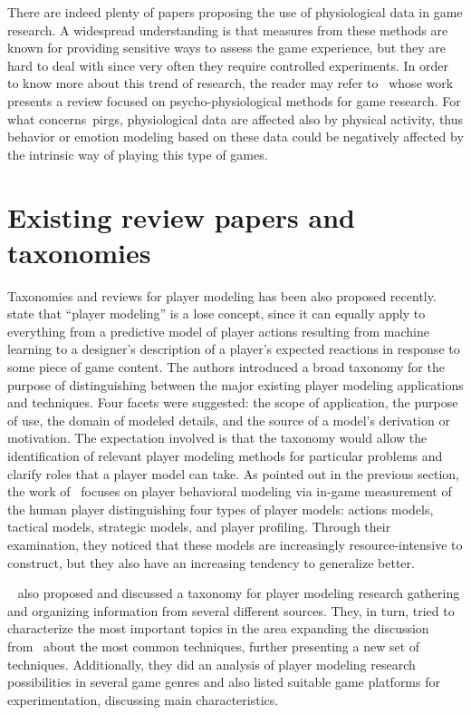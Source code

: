 There are indeed plenty of papers proposing the use of physiological data in game research. A widespread understanding is that measures from these methods are known for providing sensitive ways to assess the game experience, but they are hard to deal with since very often they require controlled experiments. In order to know more about this trend of research, the reader may refer to~\cite{kivikangas_review_2011} whose work presents a review focused on psycho-physiological methods for game research. For what concerns~\gls{pirg}s, physiological data are affected also by physical activity, thus behavior or emotion modeling based on these data could be negatively affected by the intrinsic way of playing this type of games.   
 
\section{Existing review papers and taxonomies}\label{reviews}
Taxonomies and reviews for player modeling has been also proposed recently.~\cite{smith_inclusive_2011} state that ``player modeling'' is a lose concept, since it can equally apply to everything from a predictive model of player actions resulting from machine learning to a designer's description of a player's expected reactions in response to some piece of game content. The authors introduced a broad taxonomy for the purpose of distinguishing between the major existing player modeling applications and techniques. Four facets were suggested: the scope of application, the purpose of use, the domain of modeled details, and the source of a model's derivation or motivation. The expectation involved is that the taxonomy would allow the identification of relevant player modeling methods for particular problems and clarify roles that a player model can take. As pointed out in the previous section, the work of~\cite{bakkes_player_2012} focuses on player behavioral modeling via in-game measurement of the human player distinguishing four types of player models: actions models, tactical models, strategic models, and player profiling. Through their examination, they noticed that these models are increasingly resource-intensive to construct, but they also have an increasing tendency to generalize better.%

~\cite{machado_player_2011} also proposed and discussed a taxonomy for player modeling research gathering and organizing information from several different sources. They, in turn, tried to characterize the most important topics in the area expanding the discussion from~\cite{herik_opponent_2005} about the most common techniques, further presenting a new set of techniques. Additionally, they did an analysis of player modeling research possibilities in several game genres and also listed suitable game platforms for experimentation, discussing main characteristics.

